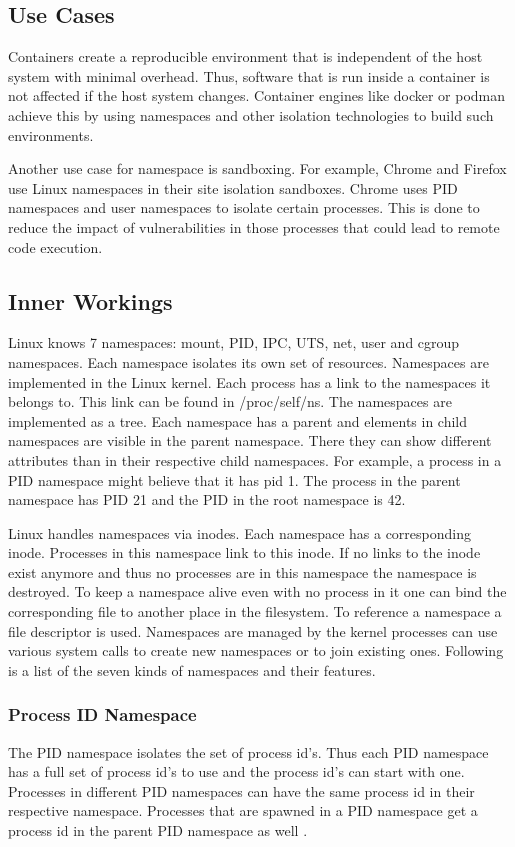 \documentclass[10pt,twocolumn,a4paper]{article}
\begin{document}
\subsection{Use Cases}
Containers create a reproducible environment that is independent of the host system with minimal overhead.
Thus, software that is run inside a container is not affected if the host system changes. 
Container engines like docker or podman achieve this by using namespaces and other isolation
technologies to build such environments.


Another use case for namespace is sandboxing. For example, Chrome and Firefox use Linux namespaces
in their site isolation sandboxes. 
Chrome uses PID namespaces and user namespaces to isolate certain processes.
This is done to reduce the impact of vulnerabilities in those processes that could lead to remote code execution.


\subsection{Inner Workings}
Linux knows 7 namespaces: mount, PID, IPC, UTS, net, user and cgroup namespaces. Each namespace isolates its own set of resources. Namespaces are implemented in the Linux kernel.
Each process has a link to the namespaces it belongs to. This link can be found in /proc/self/ns\cite{8}.
The namespaces are implemented as a tree.
Each namespace has a parent and elements in child namespaces are visible in the parent namespace.
There they can show different attributes than in their respective child namespaces. 
For example, a process in a PID namespace might believe that it has pid 1.
The process in the parent namespace has PID  21 and the PID in the root namespace is 42.

Linux handles namespaces via inodes. Each namespace has a corresponding inode.
Processes in this namespace link to this inode. If no links to the inode exist anymore and thus no processes are in
this namespace the namespace is destroyed. 
To keep a namespace alive even with no process in it one can bind the corresponding file to another place in the filesystem.
To reference a namespace a file descriptor is used.
Namespaces are managed by the kernel processes can use various system calls to create new namespaces or to join existing ones.\cite{8}
Following is a list of the seven kinds of namespaces and their features.


\subsubsection{Process ID Namespace}
The PID namespace isolates the set of process id's. 
Thus each PID namespace has a full set of process id's to use and  the process id's can start with one.
Processes in different PID namespaces can have the same process id in their respective namespace. 
Processes that are spawned in a PID namespace get a process id in the parent PID namespace as well 
\cite{11}.
\end{document}
